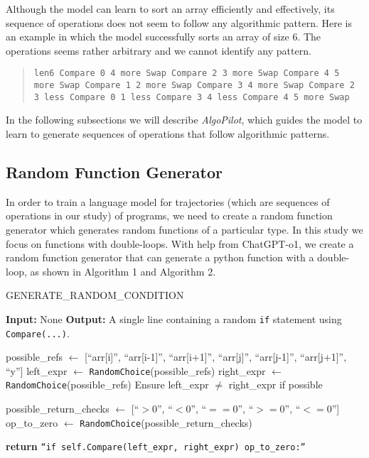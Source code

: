 \documentclass[pdflatex,sn-mathphys-num]{sn-jnl}%
\theoremstyle{thmstyleone}%
\theoremstyle{thmstyletwo}%
\theoremstyle{thmstylethree}%
\begin{document}
Although the model can learn to sort an array efficiently and effectively, its sequence of operations does not seem to follow any algorithmic pattern. Here is an example in which the model successfully sorts an array of size 6. The operations seems rather arbitrary and we cannot identify any pattern. 

\begin{quote}
    \texttt{len6 Compare 0 4 more Swap Compare 2 3 more Swap Compare 4 5 more Swap Compare 1 2 more Swap Compare 3 4 more Swap Compare 2 3 less Compare 0 1 less Compare 3 4 less Compare 4 5 more Swap}
\end{quote}

In the following subsections we will describe \emph{AlgoPilot}, which guides the model to learn to generate sequences of operations that follow algorithmic patterns.


\subsection{Random Function Generator} \label{ssec:randfunc}

In order to train a language model for trajectories (which are sequences of operations in our study) of programs, we need to create a random function generator which generates random functions of a particular type. In this study we focus on functions with double-loops. With help from ChatGPT-o1, we create a random function generator that can generate a python function with a double-loop, as shown in Algorithm 1 and Algorithm 2.

\begin{algorithm}
\caption{GENERATE\_RANDOM\_CONDITION}
\label{alg:generate_random_condition}
\begin{algorithmic}
\State \textbf{Input:} None
\State \textbf{Output:} A single line containing a random \texttt{if} statement using \texttt{Compare(...)}.

\State possible\_refs $\gets$ [``arr[i]'', ``arr[i-1]'', ``arr[i+1]'', ``arr[j]'', ``arr[j-1]'', ``arr[j+1]'', ``y'']
\State left\_expr $\gets$ \texttt{RandomChoice}(possible\_refs)
\State right\_expr $\gets$ \texttt{RandomChoice}(possible\_refs)
\State Ensure left\_expr $\neq$ right\_expr if possible

\State possible\_return\_checks $\gets$ [``$> 0$'', ``$< 0$'', ``$== 0$'', ``$>= 0$'', ``$<= 0$''] 
\State op\_to\_zero $\gets$ \texttt{RandomChoice}(possible\_return\_checks)

\State \textbf{return} \texttt{``if self.Compare(left\_expr, right\_expr) op\_to\_zero:''}
\end{algorithmic}
\end{algorithm}
\end{document}
